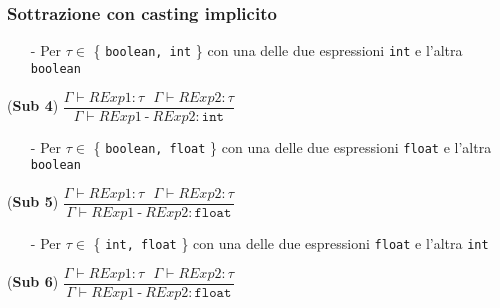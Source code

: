\documentclass[12pt]{article}
\begin{document}
\subsubsection*{Sottrazione con casting implicito}
\begin{center}
\begin{itemize}
\item[-] Per $\tau \in$ \{ \texttt{boolean, int} \} con una delle due espressioni \texttt{int} e l'altra \texttt{boolean}
\end{itemize}
\noindent(\textbf{Sub 4})
$\dfrac{\Gamma \vdash RExp1:\tau\ \ \ \Gamma \vdash RExp2:\tau}{\Gamma \vdash RExp1\ \texttt{-}\ RExp2:\texttt{int}}$\\[0.1in]
\begin{itemize}
\item[-] Per $\tau \in$ \{ \texttt{boolean, float} \} con una delle due espressioni \texttt{float} e l'altra \texttt{boolean}
\end{itemize}

\noindent(\textbf{Sub 5})
$\dfrac{\Gamma \vdash RExp1:\tau\ \ \ \Gamma \vdash RExp2:\tau}{\Gamma \vdash RExp1\ \texttt{-}\ RExp2:\texttt{float}}$\\[0.1in]
\begin{itemize}
\item[-] Per $\tau \in$ \{ \texttt{int, float} \} con una delle due espressioni \texttt{float} e l'altra \texttt{int}
\end{itemize}
\noindent(\textbf{Sub 6})
$\dfrac{\Gamma \vdash RExp1:\tau\ \ \ \Gamma \vdash RExp2:\tau}{\Gamma \vdash RExp1\ \texttt{-}\ RExp2:\texttt{float}}$\\[0.1in]
\end{center}
\end{document}
